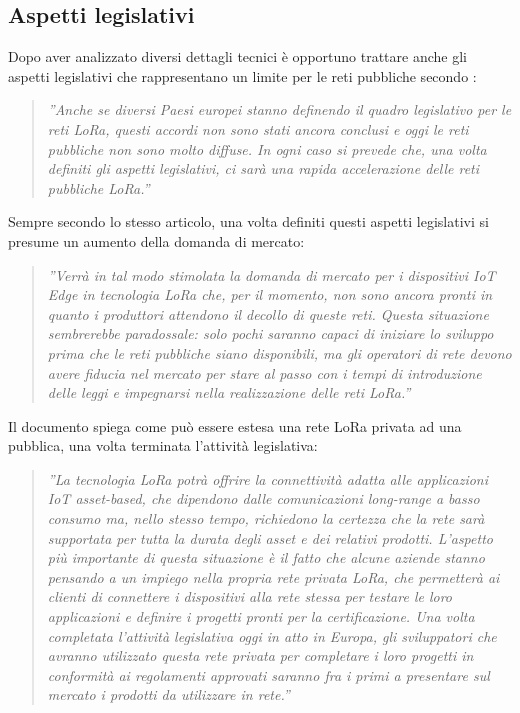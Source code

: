 \documentclass[a4paper]{report} %
\begin{document}
\subsection{Aspetti legislativi}
Dopo aver analizzato diversi dettagli tecnici è opportuno trattare anche gli aspetti legislativi che rappresentano un limite per le reti pubbliche secondo \cite{art:rif.20}:
\begin{quote}
	\textit{''Anche se diversi Paesi europei stanno definendo il quadro legislativo per le reti LoRa, questi accordi non sono stati ancora conclusi e oggi le reti pubbliche non sono molto diffuse. In ogni caso si prevede che, una volta definiti gli aspetti legislativi, ci sarà una rapida accelerazione delle reti pubbliche LoRa.''}
\end{quote}
Sempre secondo lo stesso articolo, una volta definiti questi aspetti legislativi si presume un aumento della domanda di mercato:
\begin{quote}
	\textit{''Verrà in tal modo stimolata la domanda di mercato per i dispositivi IoT Edge in tecnologia LoRa che, per il momento, non sono ancora pronti in quanto i produttori attendono il decollo di queste reti. Questa situazione sembrerebbe paradossale: solo pochi saranno capaci di iniziare lo sviluppo prima che le reti pubbliche siano disponibili, ma gli operatori di rete devono avere fiducia nel mercato per stare al passo con i tempi di introduzione delle leggi e impegnarsi nella realizzazione delle reti LoRa.''}
\end{quote}
Il documento \cite{art:rif.20} spiega come può essere estesa una rete LoRa privata ad una pubblica, una volta terminata l'attività legislativa:
\begin{quote}
	\textit{''La tecnologia LoRa potrà offrire la connettività adatta alle applicazioni IoT asset-based, che dipendono dalle comunicazioni long-range a basso consumo ma, nello stesso tempo, richiedono la certezza che la rete sarà supportata per tutta la durata degli asset e dei relativi prodotti. L'aspetto più importante di questa situazione è il fatto che alcune aziende stanno pensando a un impiego nella propria rete privata LoRa, che permetterà ai clienti di connettere i dispositivi alla rete stessa per testare le loro applicazioni e definire i progetti pronti per la certificazione. Una volta completata l'attività legislativa oggi in atto in Europa, gli sviluppatori che avranno utilizzato questa rete privata per completare i loro progetti in conformità ai regolamenti approvati saranno fra i primi a presentare sul mercato i prodotti da utilizzare in rete.''}
\end{quote}
\end{document}
